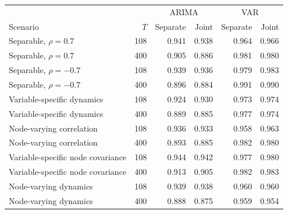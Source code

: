 \centering\small
\begin{tabular}{lrrrrr}
\hline
 & & \multicolumn{2}{c}{ARIMA} & \multicolumn{2}{c}{VAR} \\
Scenario & $T$ & Separate & Joint & Separate & Joint \\
\hline
Separable, $\rho = 0.7$ & 108 & 0.941 & 0.938 & 0.964 & 0.966 \\
Separable, $\rho = 0.7$ & 400 & 0.905 & 0.886 & 0.981 & 0.980 \\
Separable, $\rho = -0.7$ & 108 & 0.939 & 0.936 & 0.979 & 0.983 \\
Separable, $\rho = -0.7$ & 400 & 0.896 & 0.884 & 0.991 & 0.990 \\
Variable-specific dynamics & 108 & 0.924 & 0.930 & 0.973 & 0.974 \\
Variable-specific dynamics & 400 & 0.889 & 0.885 & 0.977 & 0.974 \\
Node-varying correlation & 108 & 0.936 & 0.933 & 0.958 & 0.963 \\
Node-varying correlation & 400 & 0.893 & 0.885 & 0.982 & 0.980 \\
Variable-specific node covariance & 108 & 0.944 & 0.942 & 0.977 & 0.980 \\
Variable-specific node covariance & 400 & 0.913 & 0.905 & 0.982 & 0.983 \\
Node-varying dynamics & 108 & 0.939 & 0.938 & 0.960 & 0.960 \\
Node-varying dynamics & 400 & 0.888 & 0.875 & 0.959 & 0.954 \\
\hline
\end{tabular}

